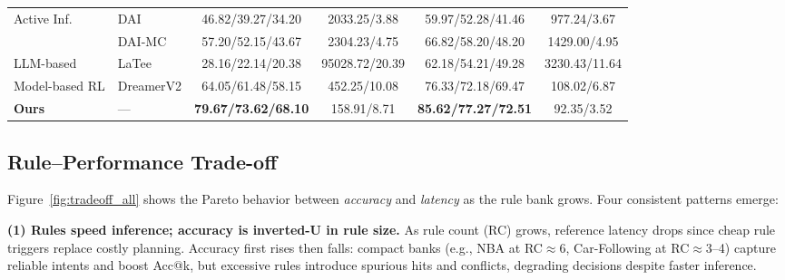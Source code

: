 \documentclass{article} %
\begin{document}
{\begin{table}[t]
{\begin{tabular}{l l c c c c}
\multirow{2}{*}{Active Inf.}
& DAI      & 46.82/39.27/34.20 & 2033.25/3.88 & 59.97/52.28/41.46 & 977.24/3.67 \\
& DAI-MC   & 57.20/52.15/43.67 & 2304.23/4.75 & 66.82/58.20/48.20 & 1429.00/4.95 \\
LLM-based & LaTee & 28.16/22.14/20.38 & 95028.72/20.39 & 62.18/54.21/49.28 & 3230.43/11.64 \\
Model-based RL & DreamerV2 & 64.05/61.48/58.15 & 452.25/10.08 & 76.33/72.18/69.47 & 108.02/6.87 \\
\textbf{Ours} & — & \textbf{79.67/73.62/68.10} & 158.91/8.71 & \textbf{85.62/77.27/72.51} & 92.35/3.52 \\
\bottomrule
\end{tabular}}
\vspace{-3mm}
\end{table}}



\subsection{Rule--Performance Trade-off}

Figure~\ref{fig:tradeoff_all} shows the Pareto behavior between \emph{accuracy} and \emph{latency} as the rule bank grows. Four consistent patterns emerge:

\textbf{(1) Rules speed inference; accuracy is inverted-U in rule size.}
As rule count (RC) grows, reference latency drops since cheap rule triggers replace costly planning. Accuracy first rises then falls: compact banks (e.g., NBA at RC$\approx$6, Car-Following at RC$\approx$3--4) capture reliable intents and boost Acc@k, but excessive rules introduce spurious hits and conflicts, degrading decisions despite faster inference.
\end{document}

